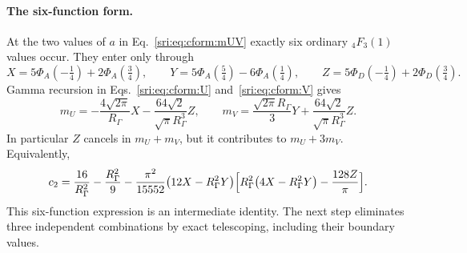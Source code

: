 \paragraph{The six-function form.} At the two values of $a$ in Eq.~\eqref{sri:eq:cform:mUV} exactly six ordinary
${}_4F_3(1)$ values occur. They enter only through
\begin{equation}
 X=5\Phi_A(-\tfrac14)+2\Phi_A(\tfrac34),\qquad Y=5\Phi_A(\tfrac54)-6\Phi_A(\tfrac14),\qquad
 Z=5\Phi_D(-\tfrac14)+2\Phi_D(\tfrac34).
 \label{sri:eq:cform:XYZ}
\end{equation}
Gamma recursion in Eqs.~\eqref{sri:eq:cform:U} and~\eqref{sri:eq:cform:V} gives
\begin{equation}
 m_U=-\frac{4\sqrt{2\pi}}{R_\Gamma}X-\frac{64\sqrt2}{\sqrt\pi R_\Gamma^3}Z,\qquad
 m_V=\frac{\sqrt{2\pi}R_\Gamma}{3}Y+\frac{64\sqrt2}{\sqrt\pi R_\Gamma^3}Z.
\end{equation}
In particular $Z$ cancels in $m_U+m_V$, but it contributes to $m_U+3m_V$. Equivalently,
\begin{equation}
 c_2=\frac{16}{R_\Gamma^2}-\frac{R_\Gamma^2}{9}-\frac{\pi^2}{15552}\bigl(12X-R_\Gamma^2Y\bigr)
 \Bigl[R_\Gamma^2\bigl(4X-R_\Gamma^2Y\bigr)-\frac{128Z}{\pi}\Bigr].
 \label{sri:eq:cform:sixfunction}
\end{equation}
This six-function expression is an intermediate identity. The next step eliminates three independent combinations by
exact telescoping, including their boundary values.

